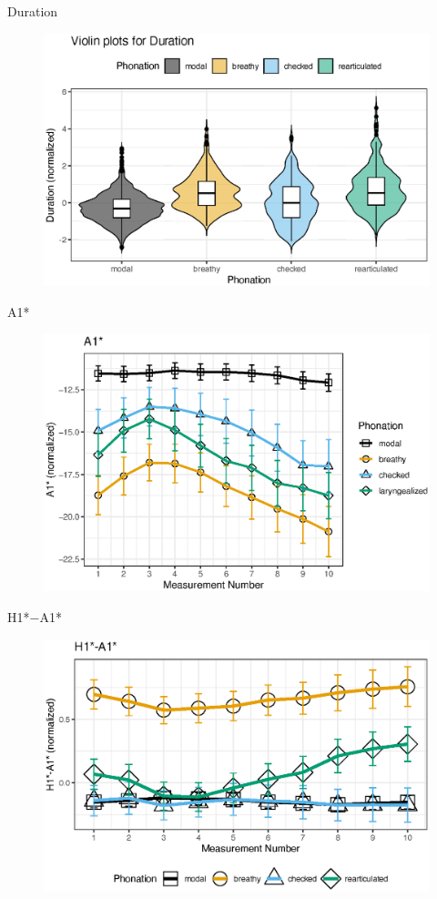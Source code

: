 \documentclass[professionalfont]{beamer}
\begin{document}
\begin{frame}{Duration}
  \begin{figure}[h!]
    \centering
    \includegraphics[width = 0.8\linewidth]{images/duration_plot.eps}
  \end{figure}
\end{frame}

\begin{frame}{A1*}
  \begin{figure}[h!]
    \centering
    \includegraphics[width = 0.8\linewidth]{images/slz_a1c.eps}
  \end{figure}
\end{frame}

\begin{frame}{H1*$-$A1*}
  \begin{figure}[h!]
    \centering
    \includegraphics[width = 0.8\linewidth]{images/h1a1_line.eps}
  \end{figure}
\end{frame}
\end{document}
